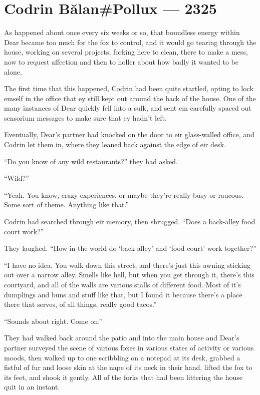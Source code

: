 \hypertarget{codrin-bux103lanpollux-2325}{%
\chapter{Codrin Bălan\#Pollux — 2325}\label{codrin-bux103lanpollux-2325}}

As happened about once every six weeks or so, that boundless energy within Dear became too much for the fox to control, and it would go tearing through the house, working on several projects, forking here to clean, there to make a mess, now to request affection and then to holler about how badly it wanted to be alone.

The first time that this happened, Codrin had been quite startled, opting to lock emself in the office that ey still kept out around the back of the house. One of the many instances of Dear quickly fell into a sulk, and sent em carefully spaced out sensorium messages to make sure that ey hadn't left.

Eventually, Dear's partner had knocked on the door to eir glass-walled office, and Codrin let them in, where they leaned back against the edge of eir desk.

``Do you know of any wild restaurants?'' they had asked.

``Wild?''

``Yeah. You know, crazy experiences, or maybe they're really busy or raucous. Some sort of theme. Anything like that.''

Codrin had searched through eir memory, then shrugged. ``Does a back-alley food court work?''

They laughed. ``How in the world do `back-alley' and `food court' work together?''

``I have no idea. You walk down this street, and there's just this awning sticking out over a narrow alley. Smells like hell, but when you get through it, there's this courtyard, and all of the walls are various stalls of different food. Most of it's dumplings and buns and stuff like that, but I found it because there's a place there that serves, of all things, really good tacos.''

``Sounds about right. Come on.''

They had walked back around the patio and into the main house and Dear's partner surveyed the scene of various foxes in various states of activity or various moods, then walked up to one scribbling on a notepad at its desk, grabbed a fistful of fur and loose skin at the nape of its neck in their hand, lifted the fox to its feet, and shook it gently. All of the forks that had been littering the house quit in an instant.

